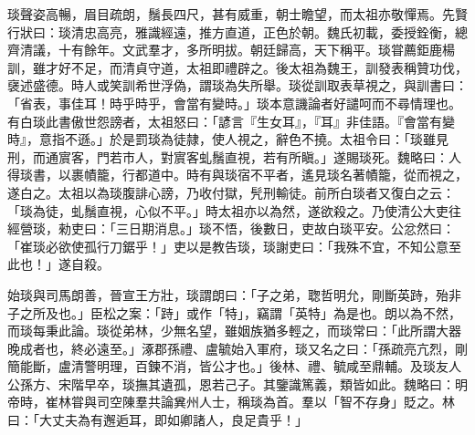 \begin{pinyinscope}
琰聲姿高暢，眉目疏朗，鬚長四尺，甚有威重，朝士瞻望，而太祖亦敬憚焉。先賢行狀曰：琰清忠高亮，雅識經遠，推方直道，正色於朝。魏氏初載，委授銓衡，總齊清議，十有餘年。文武羣才，多所明拔。朝廷歸高，天下稱平。琰甞薦鉅鹿楊訓，雖才好不足，而清貞守道，太祖即禮辟之。後太祖為魏王，訓發表稱贊功伐，襃述盛德。時人或笑訓希世浮偽，謂琰為失所舉。琰從訓取表草視之，與訓書曰：「省表，事佳耳！時乎時乎，會當有變時。」琰本意譏論者好譴呵而不尋情理也。有白琰此書傲世怨謗者，太祖怒曰：「諺言『生女耳』，『耳』非佳語。『會當有變時』，意指不遜。」於是罰琰為徒隷，使人視之，辭色不撓。太祖令曰：「琰雖見刑，而通賔客，門若市人，對賔客虬鬚直視，若有所瞋。」遂賜琰死。魏略曰：人得琰書，以裹幘籠，行都道中。時有與琰宿不平者，遙見琰名著幘籠，從而視之，遂白之。太祖以為琰腹誹心謗，乃收付獄，髠刑輸徒。前所白琰者又復白之云：「琰為徒，虬鬚直視，心似不平。」時太祖亦以為然，遂欲殺之。乃使清公大吏往經營琰，勑吏曰：「三日期消息。」琰不悟，後數日，吏故白琰平安。公忿然曰：「崔琰必欲使孤行刀鋸乎！」吏以是教告琰，琰謝吏曰：「我殊不宜，不知公意至此也！」遂自殺。

始琰與司馬朗善，晉宣王方壯，琰謂朗曰：「子之弟，聦哲明允，剛斷英跱，殆非子之所及也。」臣松之案：「跱」或作「特」，竊謂「英特」為是也。朗以為不然，而琰每秉此論。琰從弟林，少無名望，雖姻族猶多輕之，而琰常曰：「此所謂大器晚成者也，終必遠至。」涿郡孫禮、盧毓始入軍府，琰又名之曰：「孫疏亮亢烈，剛簡能斷，盧清警明理，百鍊不消，皆公才也。」後林、禮、毓咸至鼎輔。及琰友人公孫方、宋階早卒，琰撫其遺孤，恩若己子。其鑒識篤義，類皆如此。魏略曰：明帝時，崔林甞與司空陳羣共論兾州人士，稱琰為首。羣以「智不存身」貶之。林曰：「大丈夫為有邂逅耳，即如卿諸人，良足貴乎！」


\end{pinyinscope}
